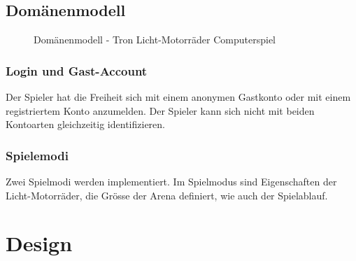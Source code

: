 \documentclass[11pt,ngerman]{article}
\begin{document}
    \subsection{Domänenmodell}
    \begin{figure}[H]
    	\centering
    	\caption{Domänenmodell - Tron Licht-Motorräder Computerspiel}
    	\label{fig:DomainModel_TronLightCycles}
	\end{figure}
	
    \subsubsection{Login und Gast-Account}
    Der Spieler hat die Freiheit sich mit einem anonymen Gastkonto oder mit einem registriertem Konto anzumelden. Der Spieler kann sich nicht mit beiden Kontoarten gleichzeitig identifizieren.

    \subsubsection{Spielemodi}
    Zwei Spielmodi werden implementiert. Im Spielmodus sind Eigenschaften der Licht-Motorräder, die Grösse der Arena definiert, wie auch der Spielablauf.



    \section{Design}
\end{document}
